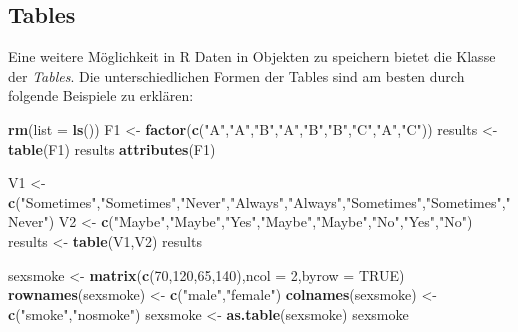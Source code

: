 \documentclass[]{article}
\newenvironment{Shaded}{\begin{snugshade}}{\end{snugshade}}
\newcommand{\KeywordTok}[1]{\textcolor[rgb]{0.13,0.29,0.53}{\textbf{#1}}}
\newcommand{\DataTypeTok}[1]{\textcolor[rgb]{0.13,0.29,0.53}{#1}}
\newcommand{\DecValTok}[1]{\textcolor[rgb]{0.00,0.00,0.81}{#1}}
\newcommand{\StringTok}[1]{\textcolor[rgb]{0.31,0.60,0.02}{#1}}
\newcommand{\OtherTok}[1]{\textcolor[rgb]{0.56,0.35,0.01}{#1}}
\newcommand{\NormalTok}[1]{#1}
\begin{document}
\subsection*{Tables}\label{tables}

Eine weitere Möglichkeit in R Daten in Objekten zu speichern bietet die
Klasse der \emph{Tables}. Die unterschiedlichen Formen der Tables sind
am besten durch folgende Beispiele zu erklären:

\begin{Shaded}
\begin{Highlighting}[]
    \KeywordTok{rm}\NormalTok{(}\DataTypeTok{list =} \KeywordTok{ls}\NormalTok{())}
\NormalTok{    F1 <-}\StringTok{ }\KeywordTok{factor}\NormalTok{(}\KeywordTok{c}\NormalTok{(}\StringTok{"A"}\NormalTok{,}\StringTok{"A"}\NormalTok{,}\StringTok{"B"}\NormalTok{,}\StringTok{"A"}\NormalTok{,}\StringTok{"B"}\NormalTok{,}\StringTok{"B"}\NormalTok{,}\StringTok{"C"}\NormalTok{,}\StringTok{"A"}\NormalTok{,}\StringTok{"C"}\NormalTok{))}
\NormalTok{    results <-}\StringTok{ }\KeywordTok{table}\NormalTok{(F1)}
\NormalTok{    results}
    \KeywordTok{attributes}\NormalTok{(F1)}
    
    
\NormalTok{    V1 <-}\StringTok{ }\KeywordTok{c}\NormalTok{(}\StringTok{"Sometimes"}\NormalTok{,}\StringTok{"Sometimes"}\NormalTok{,}\StringTok{"Never"}\NormalTok{,}\StringTok{"Always"}\NormalTok{,}\StringTok{"Always"}\NormalTok{,}\StringTok{"Sometimes"}\NormalTok{,}\StringTok{"Sometimes"}\NormalTok{,}\StringTok{"Never"}\NormalTok{)}
\NormalTok{    V2 <-}\StringTok{ }\KeywordTok{c}\NormalTok{(}\StringTok{"Maybe"}\NormalTok{,}\StringTok{"Maybe"}\NormalTok{,}\StringTok{"Yes"}\NormalTok{,}\StringTok{"Maybe"}\NormalTok{,}\StringTok{"Maybe"}\NormalTok{,}\StringTok{"No"}\NormalTok{,}\StringTok{"Yes"}\NormalTok{,}\StringTok{"No"}\NormalTok{)}
\NormalTok{    results <-}\StringTok{ }\KeywordTok{table}\NormalTok{(V1,V2)}
\NormalTok{    results    }
    
\NormalTok{    sexsmoke           <-}\StringTok{ }\KeywordTok{matrix}\NormalTok{(}\KeywordTok{c}\NormalTok{(}\DecValTok{70}\NormalTok{,}\DecValTok{120}\NormalTok{,}\DecValTok{65}\NormalTok{,}\DecValTok{140}\NormalTok{),}\DataTypeTok{ncol =} \DecValTok{2}\NormalTok{,}\DataTypeTok{byrow =} \OtherTok{TRUE}\NormalTok{)}
    \KeywordTok{rownames}\NormalTok{(sexsmoke) <-}\StringTok{ }\KeywordTok{c}\NormalTok{(}\StringTok{"male"}\NormalTok{,}\StringTok{"female"}\NormalTok{)}
    \KeywordTok{colnames}\NormalTok{(sexsmoke) <-}\StringTok{ }\KeywordTok{c}\NormalTok{(}\StringTok{"smoke"}\NormalTok{,}\StringTok{"nosmoke"}\NormalTok{)}
\NormalTok{    sexsmoke           <-}\StringTok{ }\KeywordTok{as.table}\NormalTok{(sexsmoke)}
\NormalTok{    sexsmoke}
    

\end{Highlighting}
\end{Shaded}
\end{document}

